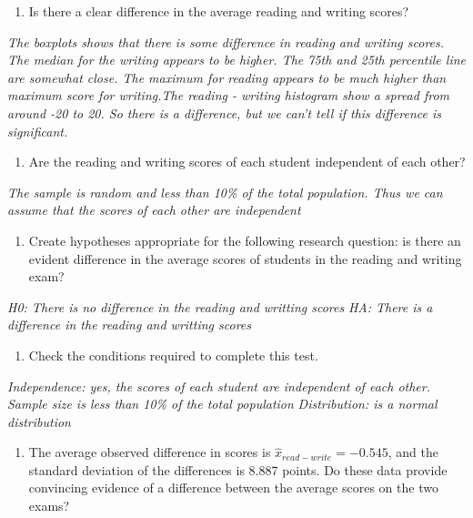 \documentclass[]{article}
\providecommand{\tightlist}{%
  \setlength{\itemsep}{0pt}\setlength{\parskip}{0pt}}
\begin{document}
\begin{enumerate}
\def\labelenumi{(\alph{enumi})}
\tightlist
\item
  Is there a clear difference in the average reading and writing scores?
\end{enumerate}

\emph{The boxplots shows that there is some difference in reading and
writing scores. The median for the writing appears to be higher. The
75th and 25th percentile line are somewhat close. The maximum for
reading appears to be much higher than maximum score for writing.The
reading - writing histogram show a spread from around -20 to 20. So
there is a difference, but we can't tell if this difference is
significant.}

\begin{enumerate}
\def\labelenumi{(\alph{enumi})}
\setcounter{enumi}{1}
\tightlist
\item
  Are the reading and writing scores of each student independent of each
  other?
\end{enumerate}

\emph{The sample is random and less than 10\% of the total population.
Thus we can assume that the scores of each other are independent}

\begin{enumerate}
\def\labelenumi{(\alph{enumi})}
\setcounter{enumi}{2}
\tightlist
\item
  Create hypotheses appropriate for the following research question: is
  there an evident difference in the average scores of students in the
  reading and writing exam?
\end{enumerate}

\emph{H0: There is no difference in the reading and writting scores}
\emph{HA: There is a difference in the reading and writting scores}

\begin{enumerate}
\def\labelenumi{(\alph{enumi})}
\setcounter{enumi}{3}
\tightlist
\item
  Check the conditions required to complete this test.
\end{enumerate}

\emph{Independence: yes, the scores of each student are independent of
each other.} \emph{Sample size is less than 10\% of the total
population} \emph{Distribution: is a normal distribution}

\begin{enumerate}
\def\labelenumi{(\alph{enumi})}
\setcounter{enumi}{4}
\tightlist
\item
  The average observed difference in scores is
  \({ \widehat { x } }_{ read-write }=-0.545\), and the standard
  deviation of the differences is 8.887 points. Do these data provide
  convincing evidence of a difference between the average scores on the
  two exams?
\end{enumerate}
\end{document}
